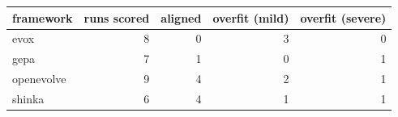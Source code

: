 \begin{tabular}{lrrrr}
\toprule
framework & runs scored & aligned & overfit (mild) & overfit (severe) \\
\midrule
evox & 8 & 0 & 3 & 0 \\
gepa & 7 & 1 & 0 & 1 \\
openevolve & 9 & 4 & 2 & 1 \\
shinka & 6 & 4 & 1 & 1 \\
\bottomrule
\end{tabular}

